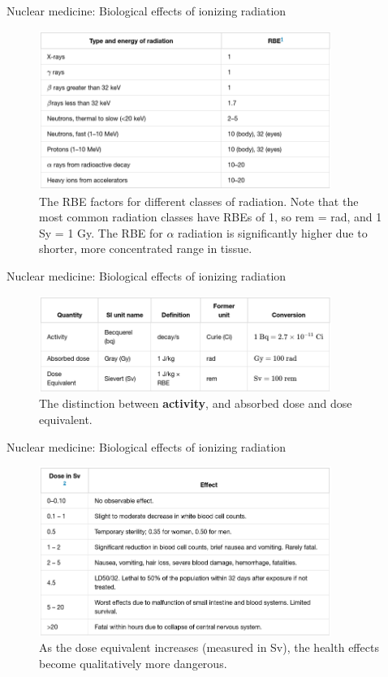 \documentclass{beamer}
\begin{document}
\begin{frame}{Nuclear medicine: Biological effects of ionizing radiation}
\begin{figure}
\centering
\includegraphics[width=0.85\textwidth]{figures/RBE.png}
\caption{\label{fig:rad_rbe} The RBE factors for different classes of radiation.  Note that the most common radiation classes have RBEs of 1, so rem = rad, and 1 Sy = 1 Gy.  The RBE for $\alpha$ radiation is significantly higher due to shorter, more concentrated range in tissue.}
\end{figure}
\end{frame}

\begin{frame}{Nuclear medicine: Biological effects of ionizing radiation}
\begin{figure}
\centering
\includegraphics[width=0.85\textwidth]{figures/rad.png}
\caption{\label{fig:rad_rbe_2} The distinction between \textbf{activity}, and absorbed dose and dose equivalent.}
\end{figure}
\end{frame}

\begin{frame}{Nuclear medicine: Biological effects of ionizing radiation}
\begin{figure}
\centering
\includegraphics[width=0.85\textwidth]{figures/sv.png}
\caption{\label{fig:rad_rbe_3} As the dose equivalent increases (measured in Sv), the health effects become qualitatively more dangerous.}
\end{figure}
\end{frame}
\end{document}
